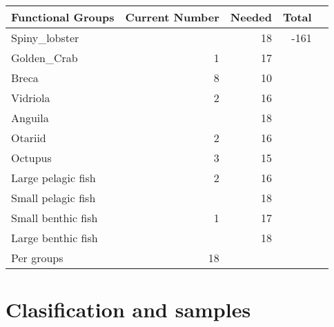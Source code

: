 \documentclass[11pt]{article}
\begin{document}
\begin{center}
\begin{tabular}{lrrrl}
 Functional Groups   &  Current Number  &  Needed  &  Total  &     \\
\hline
 Spiny_lobster       &                  &      18  &   -161  &     \\
 Golden_Crab         &               1  &      17  &         &     \\
 Breca               &               8  &      10  &         &     \\
 Vidriola            &               2  &      16  &         &     \\
 Anguila             &                  &      18  &         &     \\
 Otariid             &               2  &      16  &         &     \\
 Octupus             &               3  &      15  &         &     \\
 Large pelagic fish  &               2  &      16  &         &     \\
 Small pelagic fish  &                  &      18  &         &     \\
 Small benthic fish  &               1  &      17  &         &     \\
 Large benthic fish  &                  &      18  &         &     \\
\hline
 Per groups          &              18  &          &         &     \\
\end{tabular}
\end{center}
\section*{Clasification and samples}
\label{sec-4}
\end{document}
